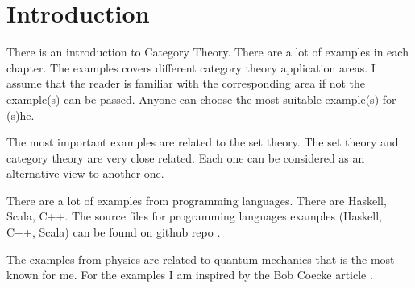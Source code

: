 \chapter*{Introduction}

There is an introduction to Category Theory. There are a lot of
examples in each chapter. The examples covers different category
theory application areas. I assume that the reader is familiar with
the corresponding area if not the example(s) can be passed. Anyone can
choose the most suitable example(s) for (s)he. 

The most important examples are related to the set theory. The set
theory and category theory are very close related. Each one can be
considered as an alternative view to another one.

There are a lot of examples from programming languages. There are
Haskell, Scala, C++. The source files for programming languages
examples (Haskell, C++, Scala) can be found on github repo
\cite{bib:github:ivanmurashko}.  

The examples from physics are related to quantum mechanics that is the
most known for me. For the examples I am inspired by the Bob Coecke
article \cite{bib:arxiv:Bob_Coecke_2008}.




